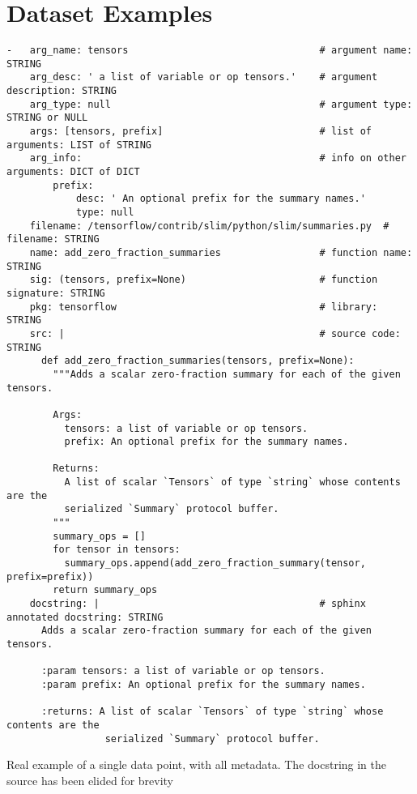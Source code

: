 
\chapter{Dataset Examples}
\label{example_datapoint}
\begin{listing}[h!]
\begin{verbatim}
-   arg_name: tensors                                 # argument name: STRING
    arg_desc: ' a list of variable or op tensors.'    # argument description: STRING
    arg_type: null                                    # argument type: STRING or NULL
    args: [tensors, prefix]                           # list of arguments: LIST of STRING
    arg_info:                                         # info on other arguments: DICT of DICT
        prefix: 
            desc: ' An optional prefix for the summary names.' 
            type: null
    filename: /tensorflow/contrib/slim/python/slim/summaries.py  # filename: STRING
    name: add_zero_fraction_summaries                 # function name: STRING 
    sig: (tensors, prefix=None)                       # function signature: STRING
    pkg: tensorflow                                   # library: STRING  
    src: |                                            # source code: STRING 
      def add_zero_fraction_summaries(tensors, prefix=None):
        """Adds a scalar zero-fraction summary for each of the given tensors.
  
        Args:
          tensors: a list of variable or op tensors.
          prefix: An optional prefix for the summary names.
  
        Returns:
          A list of scalar `Tensors` of type `string` whose contents are the
          serialized `Summary` protocol buffer.
        """
        summary_ops = []
        for tensor in tensors:
          summary_ops.append(add_zero_fraction_summary(tensor, prefix=prefix))
        return summary_ops
    docstring: |                                      # sphinx annotated docstring: STRING 
      Adds a scalar zero-fraction summary for each of the given tensors.

      :param tensors: a list of variable or op tensors.
      :param prefix: An optional prefix for the summary names.

      :returns: A list of scalar `Tensors` of type `string` whose contents are the
                 serialized `Summary` protocol buffer.
\end{verbatim}
     \caption{Real example of a single data point, with all metadata. The docstring in the source has been elided for brevity}
     \label{lst:single_point}
\end{listing}

